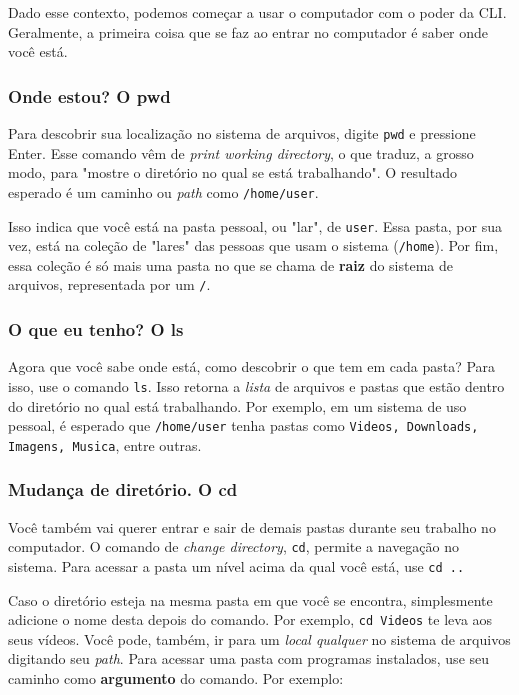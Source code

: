 \documentclass{article}
\begin{document}
	Dado esse contexto, podemos começar a usar o computador com o poder da CLI. Geralmente, a primeira coisa que se faz ao 
	entrar no computador é saber onde você está. 
	
	\subsubsection{Onde estou? O pwd}
	Para descobrir sua localização no sistema de arquivos, digite \texttt{pwd} e pressione Enter. Esse comando vêm de 
	\textit{print working directory}, o que traduz, a grosso modo, para "mostre o diretório no qual se está trabalhando". O
	resultado esperado é um caminho ou \textit{path} como \texttt{/home/user}. 

	Isso indica que você está na pasta pessoal, ou "lar", de \texttt{user}. Essa pasta, por sua vez, está 
	na coleção de "lares" das pessoas que usam o sistema (\texttt{/home}). Por fim, essa coleção é só mais uma pasta no que 
	se chama de \textbf{raiz} do sistema de arquivos, representada por um \texttt{/}. 

	\subsubsection{O que eu tenho? O ls} 

	Agora que você sabe onde está, como descobrir o que tem em cada pasta? Para isso, use o comando \texttt{ls}. Isso 
	retorna a \textit{lista} de arquivos e pastas que estão dentro do diretório no qual está trabalhando. Por exemplo, em um sistema
	de uso pessoal, é esperado que \texttt{/home/user} tenha pastas como \texttt{Videos, Downloads, Imagens, Musica}, entre
	outras. 
	
	\subsubsection{Mudança de diretório. O cd} 

	Você também vai querer entrar e sair de demais pastas durante seu trabalho no computador. O comando de \textit{change
	directory}, \texttt{cd}, permite a navegação no sistema. Para acessar a pasta um nível acima da qual você está, use 
	\texttt{cd ..} 


	Caso o diretório esteja na mesma pasta em que você se encontra, simplesmente adicione o nome desta depois do comando. 
	Por exemplo, \texttt{cd Videos} te leva aos seus vídeos. Você pode, também, ir para um \textit{local qualquer} no sistema
	de arquivos digitando seu \textit{path}. Para acessar uma pasta com programas instalados, use seu caminho como 
	\textbf{argumento} do comando. Por exemplo: 
	
\end{document}
